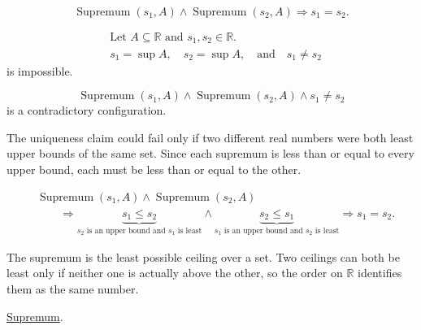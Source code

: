 \begin{remark*}
\[
\operatorname{Supremum}(s_1,A)\land \operatorname{Supremum}(s_2,A)
\Longrightarrow
s_1=s_2.
\]
\end{remark*}

\begin{remark*}
\[
\begin{aligned}
&\text{Let }A\subseteq\mathbb{R}\text{ and }s_1,s_2\in\mathbb{R}.\\
&s_1=\sup A,\quad s_2=\sup A,\quad\text{and}\quad s_1\ne s_2
\end{aligned}
\]
is impossible.
\end{remark*}

\begin{remark*}
\[
\operatorname{Supremum}(s_1,A)\land \operatorname{Supremum}(s_2,A)\land s_1\ne s_2
\]
is a contradictory configuration.
\end{remark*}

\begin{remark*}
The uniqueness claim could fail only if two different real numbers were both least upper bounds of the same set. Since each supremum is less than or equal to every upper bound, each must be less than or equal to the other.
\end{remark*}

\begin{remark*}
\[
\begin{aligned}
&\operatorname{Supremum}(s_1,A)\land \operatorname{Supremum}(s_2,A)\\
&\qquad\Longrightarrow
\underbrace{s_1\le s_2}_{s_2\text{ is an upper bound and }s_1\text{ is least}}
\land
\underbrace{s_2\le s_1}_{s_1\text{ is an upper bound and }s_2\text{ is least}}
\Longrightarrow
s_1=s_2.
\end{aligned}
\]
\end{remark*}

\begin{remark*}[Interpretation]
The supremum is the least possible ceiling over a set. Two ceilings can both be least only if neither one is actually above the other, so the order on $\mathbb{R}$ identifies them as the same number.
\end{remark*}

\begin{dependencies}
\hyperref[def:supremum]{Supremum}.
\end{dependencies}


